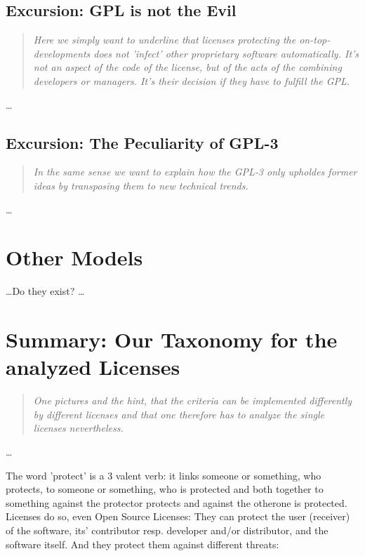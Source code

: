 \subsection{Excursion: GPL is not the Evil}
\footnotesize
\begin{quote}\itshape
Here we simply want to underline that licenses protecting the
on-top-developments does not 'infect' other proprietary software automatically.
It's not an aspect of the code of the license, but of the acts of the combining
developers or managers. It's their decision if they have to fulfill the GPL.
\end{quote}
\normalsize
\ldots

\subsection{Excursion: The Peculiarity of GPL-3}
\footnotesize
\begin{quote}\itshape
In the same sense we want to explain how the GPL-3 only upholdes former ideas by
transposing them to new technical trends.
\end{quote}
\normalsize
\ldots

\section{Other Models}
\ldots Do they exist? \ldots

\section{Summary: Our Taxonomy for the analyzed Licenses}
\footnotesize
\begin{quote}\itshape
One pictures and the hint, that the criteria can be implemented differently by
different licenses and that one therefore has to analyze the single licenses
nevertheless.
\end{quote}
\normalsize
\ldots


The word 'protect' is a 3 valent verb: it links someone or something, who
protects, to someone or something, who is protected and both together to
something against the protector protects and against the otherone is protected.
Licenses do so, even Open Source Licenses: They can protect the user (receiver)
of the software, its' contributor resp. developer and/or distributor, and the
software itself. And they protect them against different threats:

